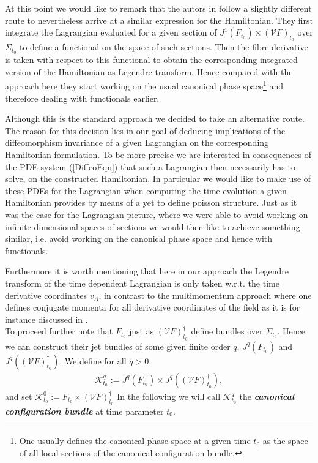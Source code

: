 \documentclass[a4paper,12pt, DIV=14, BCOR=5mm, twoside, headsepline]{scrbook}
\begin{document}
At this point we would like to remark that the autors in \cite{2004math.ph..11032G} follow a slightly different route to nevertheless arrive at a similar expression for the Hamiltonian. They first integrate the Lagrangian evaluated for a given section of $J^1(F_{t_0}) \times (\mathcal{V}F)_{t_0}$ over $\Sigma_{t_0}$ to define a functional on the space of such sections. Then the fibre derivative is taken with respect to this functional to obtain the corresponding integrated version of the Hamiltonian as Legendre transform. 
Hence compared with the approach here they start working on the usual canonical phase space\footnote{One usually defines the canonical phase space at a given time $t_0$ as the space of all local sections of the canonical configuration bundle.} and therefore dealing with functionals earlier. 

Although this is the standard approach
we decided to take an alternative route. The reason for this decision lies in our goal of deducing implications of the diffeomorphism invariance of a given Lagrangian on the corresponding Hamiltonian formulation. To be more precise we are interested in consequences of the PDE system (\ref{DiffeoEqn}) that such a Lagrangian then necessarily has to solve, on the constructed Hamiltonian. In particular we would like to make use of these PDEs for the Lagrangian when computing the time evolution a given Hamiltonian provides by means of a yet to define poisson structure. Just as it was the case for the Lagrangian picture, where we were able to avoid working on infinite dimensional spaces of  sections we would then like to achieve something similar, i.e. avoid working on the canonical phase space and hence with functionals.

Furthermore it is worth mentioning that here in our approach the Legendre transform of the time dependent Lagrangian is only taken w.r.t. the time derivative coordinates $\dot{v}_A$, in contrast to the multimomentum approach where one defines conjugate momenta for all derivative coordinates of the field as it is for instance discussed in \cite{1998physics...1019G}. \\

To proceed further note that $F_{t_0}$ just as $(\mathcal{V}F)_{t_0}^{\dagger}$ define bundles over $\Sigma_{t_0}$. Hence we can construct their jet bundles of some given finite order $q$, $J^q(F_{t_0})$ and $J^q((\mathcal{V}F)_{t_0}^{\dagger})$. 
We define for all $q>0$
\begin{align} 
\mathcal{K}^q_{t_0} := J^q(F_{t_0})\times J^q((\mathcal{V}F)_{t_0}^{\dagger}),
\end{align}
and set $\mathcal{K}^0_{t_0} := F_{t_0}\times (\mathcal{V}F)_{t_0}^{\dagger}$
In the following we will call $\mathcal{K}^q_{t_0}$ the \textit{\textbf{canonical configuration bundle}} at time parameter $t_0$. 
\end{document}
